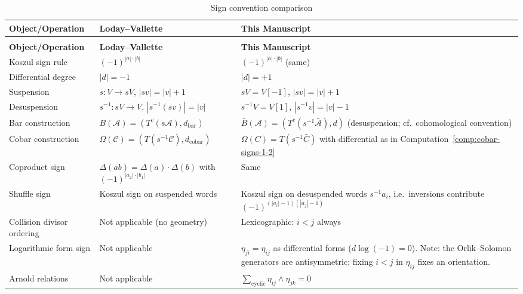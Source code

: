 \begin{center}
\begin{longtable}{|>{\raggedright\arraybackslash}p{5.8cm}|>{\raggedright\arraybackslash}p{3.9cm}|>{\raggedright\arraybackslash}p{3.9cm}|}
\caption{Sign convention comparison} \\
\hline
\textbf{Object/Operation} & \textbf{Loday--Vallette \cite{LV12}} & \textbf{This Manuscript} \\
\hline
\endfirsthead
\multicolumn{3}{c}{\tablename\ \thetable\ -- \textit{Continued}} \\
\hline
\textbf{Object/Operation} & \textbf{Loday--Vallette} & \textbf{This Manuscript} \\
\hline
\endhead
\hline
\endfoot
\hline
\endlastfoot
Koszul sign rule & $(-1)^{|a| \cdot |b|}$ & $(-1)^{|a| \cdot |b|}$ (same) \\
Differential degree & $|d| = -1$ & $|d| = +1$ \\
Suspension & $s: V \to sV$, $|sv| = |v| + 1$ & $sV=V[-1]$, $|sv| = |v|+1$ \\
Desuspension & $s^{-1}:sV\to V$, $|s^{-1}(sv)|=|v|$ & $s^{-1}V=V[1]$, $|s^{-1}v|=|v|-1$ \\
Bar construction & $B(\mathcal{A}) = (T^c(s\mathcal{A}), d_{\text{bar}})$ & $\bar{B}(\mathcal{A}) = (T^c(s^{-1}\bar{\mathcal{A}}), d)$ (desuspension; cf.\ cohomological convention) \\
Cobar construction & $\Omega(\mathcal{C}) = (T(s^{-1}\mathcal{C}), d_{\text{cobar}})$ & $\Omega(C)=T(s^{-1}\bar C)$ with differential as in Computation~\ref{comp:cobar-signs-1-2} \\
Coproduct sign & $\Delta(ab) = \Delta(a) \cdot \Delta(b)$ with $(-1)^{|a_2| \cdot |b_1|}$ & Same \\
Shuffle sign & Koszul sign on suspended words & Koszul sign on desuspended words $s^{-1}a_i$, i.e.\ inversions contribute $(-1)^{(|a_i|-1)(|a_j|-1)}$ \\
Collision divisor ordering & Not applicable (no geometry) & Lexicographic: $i < j$ always \\
Logarithmic form sign & Not applicable & $\eta_{ji} = \eta_{ij}$ as differential forms ($d\log(-1)=0$). Note: the Orlik--Solomon generators are antisymmetric; fixing $i < j$ in $\eta_{ij}$ fixes an orientation. \\
Arnold relations & Not applicable & $\sum_{\text{cyclic}} \eta_{ij} \wedge \eta_{jk} = 0$ \\
\end{longtable}
\end{center}

